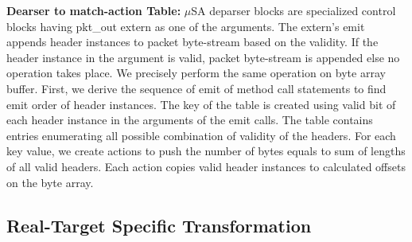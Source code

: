 \documentclass{hotnets19}
\begin{document}
\textbf{Dearser to match-action Table:} 
$\mu$SA deparser blocks are specialized control blocks having pkt\_out extern as one of the arguments.
The extern's emit appends header instances to packet byte-stream based on the validity.
If the header instance in the argument is valid, packet byte-stream is appended else no operation takes place.
We precisely perform the same operation on byte array buffer.
First, we derive the sequence of emit of method call statements to find emit order of header instances.
The key of the table is created using valid bit of each header instance in the arguments of the emit calls.
The table contains entries enumerating all possible combination of validity of the headers.
For each key value, we create actions to push the number of bytes equals to sum of lengths of all valid headers.
Each action copies valid header instances to calculated offsets on the byte array.



\subsection{Real-Target Specific Transformation}
\end{document}

